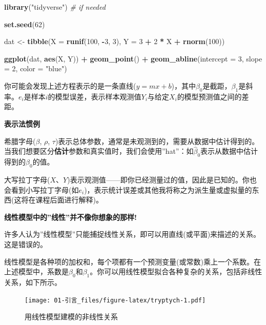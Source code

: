 \documentclass[
]{book}
\newenvironment{Shaded}{\begin{snugshade}}{\end{snugshade}}
\newcommand{\AttributeTok}[1]{\textcolor[rgb]{0.13,0.29,0.53}{#1}}
\newcommand{\CommentTok}[1]{\textcolor[rgb]{0.56,0.35,0.01}{\textit{#1}}}
\newcommand{\DecValTok}[1]{\textcolor[rgb]{0.00,0.00,0.81}{#1}}
\newcommand{\FunctionTok}[1]{\textcolor[rgb]{0.13,0.29,0.53}{\textbf{#1}}}
\newcommand{\NormalTok}[1]{#1}
\newcommand{\OtherTok}[1]{\textcolor[rgb]{0.56,0.35,0.01}{#1}}
\newcommand{\SpecialCharTok}[1]{\textcolor[rgb]{0.81,0.36,0.00}{\textbf{#1}}}
\newcommand{\StringTok}[1]{\textcolor[rgb]{0.31,0.60,0.02}{#1}}
\begin{document}
\begin{Shaded}
\begin{Highlighting}[]
\FunctionTok{library}\NormalTok{(}\StringTok{"tidyverse"}\NormalTok{) }\CommentTok{\# if needed}

\FunctionTok{set.seed}\NormalTok{(}\DecValTok{62}\NormalTok{)}

\NormalTok{dat }\OtherTok{\textless{}{-}} \FunctionTok{tibble}\NormalTok{(}\AttributeTok{X =} \FunctionTok{runif}\NormalTok{(}\DecValTok{100}\NormalTok{, }\SpecialCharTok{{-}}\DecValTok{3}\NormalTok{, }\DecValTok{3}\NormalTok{),}
              \AttributeTok{Y =} \DecValTok{3} \SpecialCharTok{+} \DecValTok{2} \SpecialCharTok{*}\NormalTok{ X }\SpecialCharTok{+} \FunctionTok{rnorm}\NormalTok{(}\DecValTok{100}\NormalTok{))}

\FunctionTok{ggplot}\NormalTok{(dat, }\FunctionTok{aes}\NormalTok{(X, Y)) }\SpecialCharTok{+}
  \FunctionTok{geom\_point}\NormalTok{() }\SpecialCharTok{+}
  \FunctionTok{geom\_abline}\NormalTok{(}\AttributeTok{intercept =} \DecValTok{3}\NormalTok{, }\AttributeTok{slope =} \DecValTok{2}\NormalTok{, }\AttributeTok{color =} \StringTok{"blue"}\NormalTok{)}
\end{Highlighting}
\end{Shaded}

你可能会发现上述方程表示的是一条直线(\(y = mx + b\))，其中\(\beta_0\)是截距，\(\beta_1\)是斜率。\(e_i\)是样本\(i\)的模型误差，表示样本观测值\(Y_i\)与给定\(X_i\)的模型预测值之间的差距。

\textbf{表示法惯例}

希腊字母(\(\beta\), \(\rho\), \(\tau\))表示总体参数，通常是未观测到的，需要从数据中估计得到的。当我们想要区分\textbf{估计}参数和真实值时，我们会使用''hat''：如\(\hat{\beta}_0\)表示从数据中估计得到的\(\beta_0\)的值。

大写拉丁字母(\(X\)、\(Y\))表示观测值------即你已经测量过的值，因此是已知的。你也会看到小写拉丁字母(如\(e_i\))，表示统计误差或其他我将称之为派生量或虚拟量的东西(这将在课程后面进行解释)。

\textbf{线性模型中的''线性''并不像你想象的那样!}

许多人认为''线性模型''只能捕捉线性关系，即可以用直线(或平面)来描述的关系。这是错误的。

线性模型是各种项的加权和，每个项都有一个预测变量(或常数)乘上一个系数。在上述模型中，系数是\(\beta_0\)和\(\beta_1\)。你可以用线性模型拟合各种复杂的关系，包括非线性关系，如下所示。

\begin{figure}
\centering
\texttt{[image: 01-引言\_files/figure-latex/tryptych-1.pdf]}
\caption{\label{fig:tryptych}用线性模型建模的非线性关系}
\end{figure}
\end{document}
